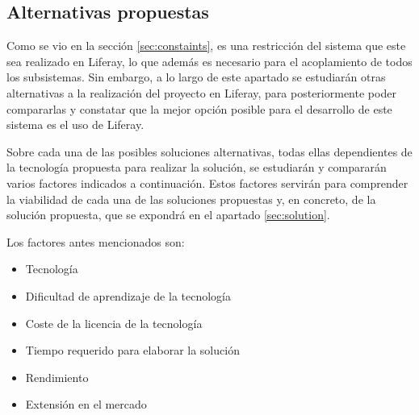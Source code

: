 \subsection{Alternativas propuestas}

\par Como se vio en la sección \ref{sec:constaints}, es una restricción del sistema que este sea realizado en Liferay, lo que además es necesario para el acoplamiento de todos los subsistemas. Sin embargo, a lo largo de este apartado se estudiarán otras alternativas a la realización del proyecto en Liferay, para posteriormente poder compararlas y constatar que la mejor opción posible para el desarrollo de este sistema es el uso de Liferay.

\par Sobre cada una de las posibles soluciones alternativas, todas ellas dependientes de la tecnología propuesta para realizar la solución, se estudiarán y compararán varios factores indicados a continuación. Estos factores servirán para comprender la viabilidad de cada una de las soluciones propuestas y, en concreto, de la solución propuesta, que se expondrá en el apartado \ref{sec:solution}.

\par Los factores antes mencionados son:
\begin{itemize}
    \item Tecnología
    \item Dificultad de aprendizaje de la tecnología
    \item Coste de la licencia de la tecnología
    \item Tiempo requerido para elaborar la solución
    \item Rendimiento
    \item Extensión en el mercado
\end{itemize}
